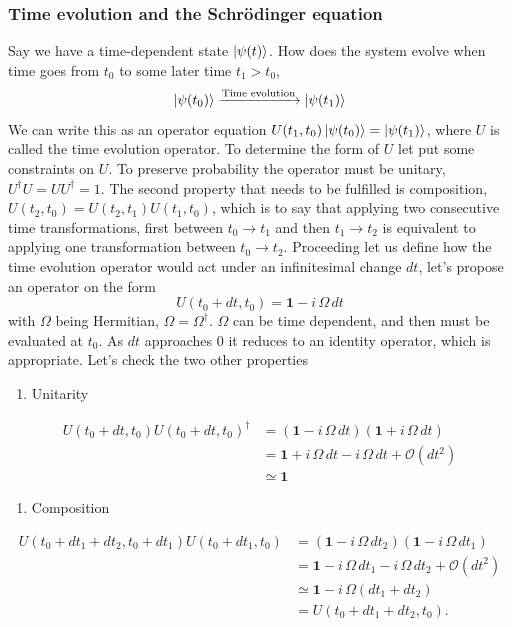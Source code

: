 \subsubsection{Time evolution and the Schrödinger equation}
Say we have a time-dependent state $\ket{\psi(t)}$. How does the system evolve when time goes from $t_0$ to some later time $t_1 > t_0$, 
\begin{equation}
\ket{\psi(t_0)} \xrightarrow{\text{Time evolution}} \ket{\psi(t_1)} 
\end{equation}
We can write this as an operator equation $U(t_1,t_0)\ket{\psi(t_0)} = \ket{\psi(t_1)}$, where $U$ is called the time evolution operator. To determine the form of $U$ let put some constraints on $U$. To preserve probability the operator must be unitary, $U^\dagger U = UU^\dagger = 1$.
The second property that needs to be fulfilled is composition, $U(t_2,t_0) = U(t_2,t_1)U(t_1,t_0)$, which is to say that applying two consecutive time transformations, first between $t_0 \rightarrow t_1$ and then $t_1 \rightarrow t_2$ is equivalent to applying one transformation between $t_0 \rightarrow t_2$. 
Proceeding let us define how the time evolution operator would act under an infinitesimal change $dt$, let's propose an operator on the form
\begin{equation}
U(t_0 +dt, t_0) = \mathbf{1} - i\,\Omega\,dt
\end{equation}
with $\Omega$ being Hermitian, $\Omega = \Omega^\dagger$. $\Omega$ can be time dependent, and then must be evaluated at $t_0$. As $dt$ approaches $0$ it reduces to an identity operator, which is appropriate.
Let's check the two other properties
\begin{enumerate}
\item Unitarity
\end{enumerate}
\begin{equation}
\begin{aligned}
U(t_0 +dt, t_0)U(t_0 +dt, t_0)^\dagger &= \left( \mathbf{1} - i\,\Omega\,dt \right)\left(\mathbf{1} + i\,\Omega\,dt \right) \\&= \mathbf{1} + i\,\Omega\,dt - i\,\Omega\,dt + \mathcal{O}(dt^2) \\&\simeq \mathbf{1}
\end{aligned}
\end{equation}
\begin{enumerate}[resume]
\item Composition
\end{enumerate}
\begin{equation}
\begin{aligned}
U(t_0 + dt_1 + dt_2,t_0 + dt_1)U(t_0 + dt_1,t_0) &= (\mathbf{1} - i\,\Omega\,dt_2)(\mathbf{1} - i\,\Omega\,dt_1) \\&= \mathbf{1} - i\,\Omega\,dt_1 - i\,\Omega\,dt_2 + \mathcal{O}(dt^2) \\&\simeq \mathbf{1} - i\,\Omega(dt_1 + dt_2) \\&= U(t_0 + dt_1 + dt_2,t_0).
\end{aligned}
\end{equation}
